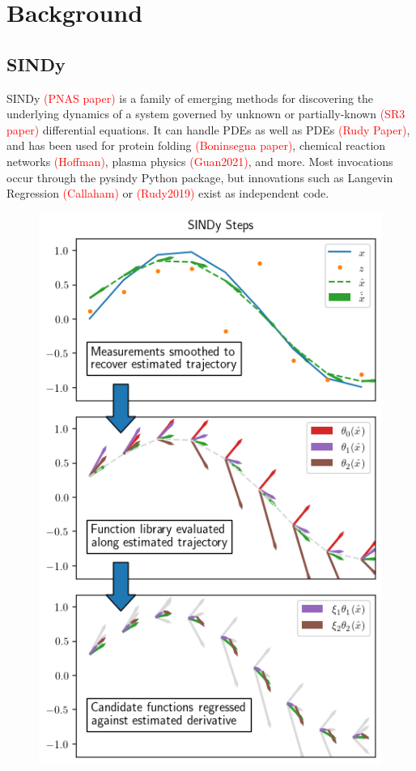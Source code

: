 \documentclass{article}
\newcommand{\red}[1]{\textcolor{red}{#1}}
\begin{document}
\section{Background}

\subsection{SINDy}
SINDy \red{(PNAS paper)} is a family of emerging methods for discovering the underlying dynamics of a system governed by unknown or partially-known \red{(SR3 paper)} differential equations.  It can handle PDEs as well as PDEs \red{(Rudy Paper)}, and has been used for protein folding \red{(Boninsegna paper)}, chemical reaction networks \red{(Hoffman)}, plasma physics \red{(Guan2021)}, and more.  Most invocations occur through the pysindy Python package, but innovations such as Langevin Regression \red{(Callaham)} or \red{(Rudy2019)} exist as independent code.

\begin{figure}
    \includegraphics{images/explain_sindy}
\end{figure}
\end{document}
